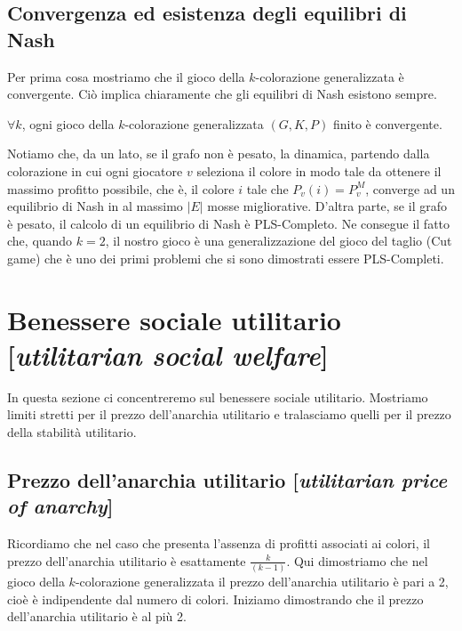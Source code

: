 \subsection{Convergenza ed esistenza degli equilibri di Nash}
\justify
Per prima cosa mostriamo che il gioco della \(k\)-colorazione generalizzata è convergente. Ciò implica chiaramente che gli equilibri di Nash esistono sempre.\\

\begin{prop}
\label{proposition1}
	\(\forall k\), ogni gioco della \(k\)-colorazione generalizzata \((G, K, P)\) finito è convergente.
\end{prop}

Notiamo che, da un lato, se il grafo non è pesato, la dinamica, partendo dalla colorazione in cui ogni giocatore \(v\) seleziona il colore in modo tale da ottenere il massimo profitto possibile, che è, il colore \(i\) tale che \(P_v (i) = P_v^M\), converge ad un equilibrio di Nash in al massimo \(|E|\) mosse migliorative. D'altra parte, se il grafo è pesato, il calcolo di un equilibrio di Nash è PLS-Completo. Ne consegue il fatto che, quando \(k = 2\), il nostro gioco è una generalizzazione del gioco del taglio (Cut game) che è uno dei primi problemi che si sono dimostrati essere PLS-Completi.\\

\section{Benessere sociale utilitario [\textit{utilitarian social welfare}]}
\justify
In questa sezione ci concentreremo sul benessere sociale utilitario. Mostriamo limiti stretti per il prezzo dell'anarchia utilitario e tralasciamo quelli per il prezzo della stabilità utilitario.\\

\subsection{Prezzo dell'anarchia utilitario [\textit{utilitarian price of anarchy}]}
\justify
Ricordiamo che nel caso che presenta l'assenza di profitti associati ai colori, il prezzo dell'anarchia utilitario è esattamente \(\frac{k}{(k-1)}\). Qui dimostriamo che nel gioco della \(k\)-colorazione generalizzata il prezzo dell'anarchia utilitario è pari a 2, cioè è indipendente dal numero di colori. Iniziamo dimostrando che il prezzo dell'anarchia utilitario è al più 2.\\


